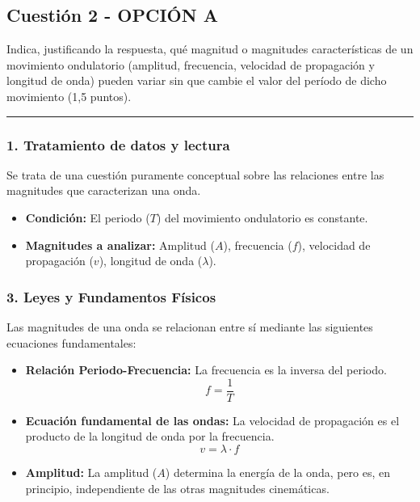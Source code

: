 \subsection{Cuestión 2 - OPCIÓN A}
\label{subsec:2A_2009_sep_ext}

\begin{cajaenunciado}
Indica, justificando la respuesta, qué magnitud o magnitudes características de un movimiento ondulatorio (amplitud, frecuencia, velocidad de propagación y longitud de onda) pueden variar sin que cambie el valor del período de dicho movimiento (1,5 puntos).
\end{cajaenunciado}
\hrule

\subsubsection*{1. Tratamiento de datos y lectura}
Se trata de una cuestión puramente conceptual sobre las relaciones entre las magnitudes que caracterizan una onda.
\begin{itemize}
    \item \textbf{Condición:} El periodo ($T$) del movimiento ondulatorio es constante.
    \item \textbf{Magnitudes a analizar:} Amplitud ($A$), frecuencia ($f$), velocidad de propagación ($v$), longitud de onda ($\lambda$).
\end{itemize}

\subsubsection*{3. Leyes y Fundamentos Físicos}
Las magnitudes de una onda se relacionan entre sí mediante las siguientes ecuaciones fundamentales:
\begin{itemize}
    \item \textbf{Relación Periodo-Frecuencia:} La frecuencia es la inversa del periodo.
    $$ f = \frac{1}{T} $$
    \item \textbf{Ecuación fundamental de las ondas:} La velocidad de propagación es el producto de la longitud de onda por la frecuencia.
    $$ v = \lambda \cdot f $$
    \item \textbf{Amplitud:} La amplitud ($A$) determina la energía de la onda, pero es, en principio, independiente de las otras magnitudes cinemáticas.
\end{itemize}


